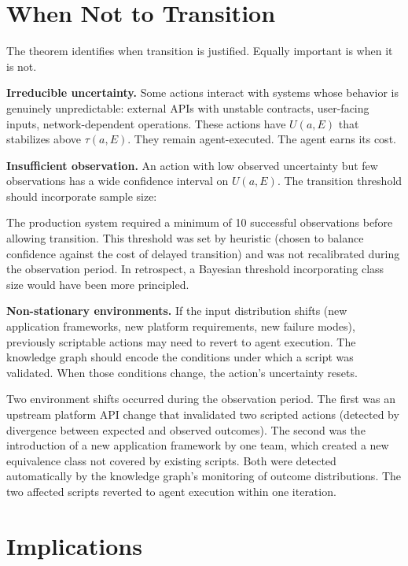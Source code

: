 \documentclass[11pt]{article}
\theoremstyle{definition}
\begin{document}
\section{When Not to Transition}
\label{sec:exceptions}

The theorem identifies when transition is justified. Equally important
is when it is not.

\textbf{Irreducible uncertainty.} Some actions interact with systems
whose behavior is genuinely unpredictable: external APIs with unstable
contracts, user-facing inputs, network-dependent operations. These
actions have $U(a, E)$ that stabilizes above $\tau(a, E)$. They remain
agent-executed. The agent earns its cost.

\textbf{Insufficient observation.} An action with low observed
uncertainty but few observations has a wide confidence interval on
$U(a, E)$. The transition threshold should incorporate sample size:

The production system required a minimum of 10 successful observations
before allowing transition. This threshold was set by heuristic
(chosen to balance confidence against the cost of delayed transition)
and was not recalibrated during the observation period. In retrospect,
a Bayesian threshold incorporating class size would have been more
principled.

\textbf{Non-stationary environments.} If the input distribution shifts
(new application frameworks, new platform requirements, new failure
modes), previously scriptable actions may need to revert to agent
execution. The knowledge graph should encode the conditions under
which a script was validated. When those conditions change, the
action's uncertainty resets.

Two environment shifts occurred during the observation period. The
first was an upstream platform API change that invalidated two scripted
actions (detected by divergence between expected and observed outcomes).
The second was the introduction of a new application framework by one
team, which created a new equivalence class not covered by existing
scripts. Both were detected automatically by the knowledge graph's
monitoring of outcome distributions. The two affected scripts reverted
to agent execution within one iteration.

\section{Implications}
\label{sec:implications}
\end{document}
